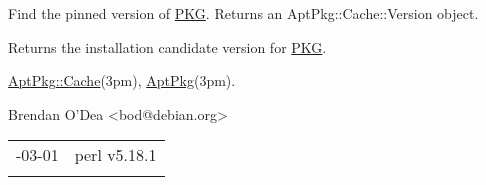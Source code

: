 \documentclass[]{article}
\renewcommand{\emph}[1]{\underline{#1}}
\begin{document}
\begin{description}
\itemsep1pt\parskip0pt
\item[match(\emph{PKG})]
Find the pinned version of \emph{PKG}. Returns an AptPkg::Cache::Version
object.
\end{description}

\begin{description}
\itemsep1pt\parskip0pt
\item[candidate(\emph{PKG})]
Returns the installation candidate version for \emph{PKG}.
\end{description}


\emph{AptPkg::Cache}(3pm), \emph{AptPkg}(3pm).


Brendan O'Dea \textless{}bod@debian.org\textgreater{}

\begin{longtable}[c]{@{}ll@{}}
\toprule\addlinespace
2013-03-01 & perl v5.18.1
\\\addlinespace
\bottomrule
\end{longtable}
\end{document}

